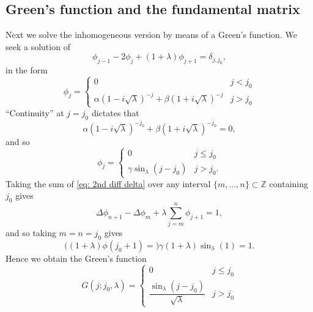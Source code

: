 \documentclass[11pt]{article}
\theoremstyle{definition}
\begin{document}
\subsection{Green's function and the fundamental matrix}
Next we solve the inhomogeneous version by means of a Green's function. We seek a solution of
\begin{equation}\label{eq: 2nd diff delta}
\phi_{j-1}-2\phi_{j}+(1+\lambda)\phi_{j+1}=\delta_{j,j_0},
\end{equation}
in the form
\begin{equation}
\phi_{j}=
\begin{cases}
0                         & j<j_0\\
\alpha(1-i\sqrt\lambda)^{-j}+\beta(1+i\sqrt\lambda)^{-j} & j>j_0	
\end{cases}
\end{equation}
``Continuity'' at $j=j_0$ dictates that 
\begin{equation}
\alpha(1-i\sqrt\lambda)^{-j_0}+\beta(1+i\sqrt\lambda)^{-j_0}=0,
\end{equation}
and so
\begin{equation}
\phi_{j}=
\begin{cases}
0                         & j\le j_0\\
\gamma\sin_\lambda(j-j_0)            & j>j_0.	
\end{cases}
\end{equation}
Taking the sum of \eqref{eq: 2nd diff delta} over any interval $\{m,\dots,n\}\subset\mathbb Z$ containing $j_0$ gives
\begin{equation}
\Delta\phi_{n+1}-\Delta\phi_{m}+\lambda\sum_{j=m}^{n}\phi_{j+1}=1,	
\end{equation}
and so taking $m=n=j_0$ gives
\begin{equation}
\bigl((1+\lambda)\phi(j_0+1)=)\gamma(1+\lambda)\sin_\lambda(1)=1.
\end{equation}
Hence we obtain the Green's function 
\begin{equation}
G(j;j_0,\lambda)=
\begin{cases}
0                         & j\le j_0\\
\dfrac{\sin_\lambda(j-j_0)}{\sqrt\lambda} & j>j_0	
\end{cases}
\end{equation}
\end{document}
